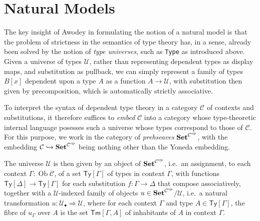 \documentclass[
  11pt,
  oneside,
  article]{memoir}
\theoremstyle{definition}
\theoremstyle{plain}
\DeclareMathOperator{\ob}{Ob}
\newcommand{\cat}[1]{\mathcal{#1}}%
\newcommand{\Cat}[1]{\mathbf{#1}}%
\newcommand{\op}{^\tn{op}}
\newcommand{\tn}[1]{\textnormal{#1}}
\newcommand{\smset}{\Cat{Set}}
\newcommand{\0}{\textsf{0}}
\newcommand{\1}{\tn{\textsf{1}}}
\begin{document}
\section{Natural Models}\label{natural-models}

The key insight of Awodey in formulating the notion of a natural model
is that the problem of strictness in the semantics of type theory has,
in a sense, already been solved by the notion of \emph{type universes},
such as \texttt{Type} as introduced above. Given a universe of types
\(\mathcal{U}\), rather than representing dependent types as display
maps, and substitution as pullback, we can simply represent a family of
types \(B[x]\) dependent upon a type \(A\) as a function
\(A \to \mathcal{U}\), with substitution then given by precomposition,
which is automatically strictly associative.

To interpret the syntax of dependent type theory in a category
\(\mathcal{C}\) of contexts and substitutions, it therefore suffices to
\emph{embed} \(\mathcal{C}\) into a category whose type-theoretic
internal language posesses such a universe whose types correspond to
those of \(\mathcal{C}\). For this purpose, we work in the category of
\emph{prehseaves} \(\smset^{\mathcal{C}\op}\), with the
embedding
\(\mathcal{C} \hookrightarrow \smset^{\mathcal{C}\op}\) being
nothing other than the Yoneda embedding.

The universe \(\mathcal{U}\) is then given by an object of
\(\smset^{\mathcal{C}\op}\), i.e.~an assignment, to each context
\(\Gamma:\ob\cat{C}\), of a set \(\mathsf{Ty}[\Gamma]\) of types in context
\(\Gamma\), with functions
\(\mathsf{Ty}[\Delta] \to \mathsf{Ty}[\Gamma]\) for each substitution
\(f : \Gamma \to \Delta\) that compose associatively, together with a
\(\mathcal{U}\)-indexed family of objects
\(u \in \smset^{\mathcal{C}\op}\)\!\(/\mathcal{U}\), i.e.~a natural
transformation \(u : \mathcal{U}_\bullet \Rightarrow \mathcal{U}\),
where for each context \(\Gamma\) and type
\(A \in \mathsf{Ty}[\Gamma]\), the fibre of \(u_\Gamma\) over \(A\) is
the set \(\mathsf{Tm}[\Gamma,A]\) of inhabitants of \(A\) in context
\(\Gamma\).
\end{document}
